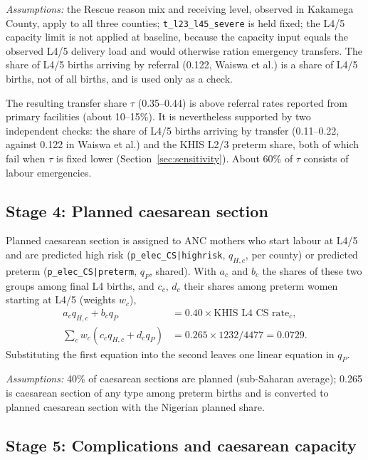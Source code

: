 \documentclass[11pt]{article}
\newcommand{\p}[1]{\texttt{#1}}
\begin{document}
\emph{Assumptions:} the Rescue reason mix and receiving level, observed in
Kakamega County, apply to all three counties; \p{t\_l23\_l45\_severe} is held
fixed; the L4/5 capacity limit is not applied at baseline, because the capacity input
equals the observed L4/5 delivery load and would otherwise ration emergency
transfers. The share of L4/5 births arriving by
referral (0.122, Waiswa et al.) is a share of L4/5 births, not of all births, and
is used only as a check.

The resulting transfer share $\tau$ (0.35--0.44) is above referral rates
reported from primary facilities (about 10--15\%). It is nevertheless supported
by two independent checks: the share of L4/5 births arriving by transfer
(0.11--0.22, against 0.122 in Waiswa et al.) and the KHIS L2/3 preterm share,
both of which fail when $\tau$ is fixed lower (Section~\ref{sec:sensitivity}).
About 60\% of $\tau$ consists of labour emergencies.

\subsection{Stage 4: Planned caesarean section}

Planned caesarean section is assigned to ANC mothers who start labour at L4/5
and are predicted high risk (\p{p\_elec\_CS|highrisk}, $q_{H,c}$, per county) or
predicted preterm (\p{p\_elec\_CS|preterm}, $q_P$, shared). With $a_c$ and $b_c$
the shares of these two groups among final L4 births, and $c_c$, $d_c$ their
shares among preterm women starting at L4/5 (weights $w_c$),
\begin{align}
a_cq_{H,c}+b_cq_P&=0.40\times\text{KHIS L4 CS rate}_c,\\
\textstyle\sum_cw_c\left(c_cq_{H,c}+d_cq_P\right)&=0.265\times1232/4477=0.0729.
\end{align}
Substituting the first equation into the second leaves one linear equation in
$q_P$.

\emph{Assumptions:} 40\% of caesarean sections are planned (sub-Saharan
average); 0.265 is caesarean section of any type among preterm births and is
converted to planned caesarean section with the Nigerian planned share.

\subsection{Stage 5: Complications and caesarean capacity}
\end{document}
